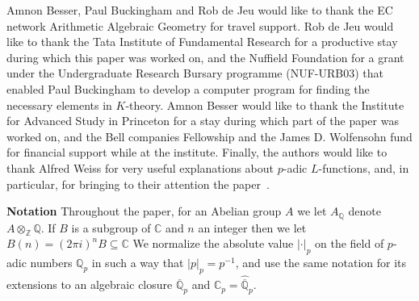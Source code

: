 \documentclass{amsart}
\begin{document}
Amnon Besser, Paul Buckingham and Rob de Jeu would like to thank the
EC network Arithmetic Algebraic Geometry for travel support.  Rob de
Jeu would like to thank the Tata Institute of Fundamental Research for
a productive stay during which this paper was worked on, and the
Nuffield Foundation for a grant under the Undergraduate Research
Bursary programme (NUF-URB03) that enabled Paul Buckingham to develop
a computer program for finding the necessary elements in $ K $-theory.
Amnon Besser would like to thank the Institute for Advanced Study in
Princeton for a stay during which part of the paper was worked on,
and the Bell companies Fellowship and the James D. Wolfensohn fund
for financial support while at the institute.  Finally, the authors
would like to thank Alfred Weiss for very useful explanations about
{$p$-adic{\futurelet{}}} {$L$-functions{\futurelet{}}}, and, in particular, for bringing to their attention
the paper~\cite{greenberg83}.

\medskip
\noindent
{\bf Notation}\hfil\break
Throughout the paper, for an Abelian group $ A $ we let $ A_{\mathbb Q} $ denote $ A {\otimes}_{\mathbb Z} {\mathbb Q} $.
If $ B $ is a subgroup of $ {\mathbb C} $ and $ n $ an integer then we let $ B(n) = (2 \pi i)^n B \subseteq {\mathbb C} $
We normalize the absolute value $ |\cdot|_p $ on the field of $p$-adic numbers ${{\mathbb Q_p}}$ 
in such a way that $|p|_p= p^{-1}$, and use the same notation for its extensions to
an algebraic closure $ {{\overline {\mathbb Q}_p}} $ and ${{\mathbb C_p}} = \hat{\overline{\mathbb Q}}_p$.
\end{document}
